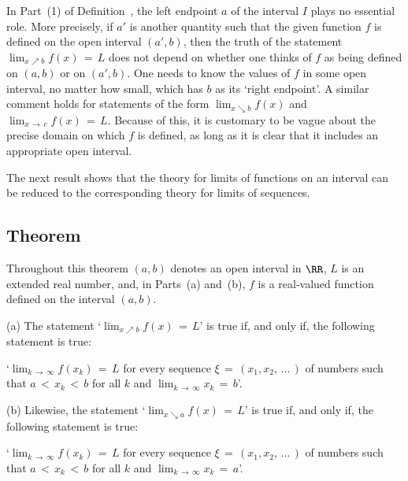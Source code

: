 {        In Part~(1) of Definition~, the left endpoint $a$ of the interval $I$ plays no essential role.
    More precisely, if $a'$ is another quantity such that the given function $f$ is defined on the open interval $(a',b)$,
    then the truth of the statement ${\displaystyle \lim_{x{\nearrow}b} f(x) \,=\, L}$ does not depend on whether one thinks of $f$ as being defined on $(a,b)$ or on $(a',b)$.
    One needs to know the values of $f$ in some open interval, no matter how small, which has $b$ as its `right endpoint'.
    A similar comment holds for statements of the form ${\displaystyle \lim_{x{\searrow}b} f(x)}$ and ${\displaystyle \lim_{x \,{\rightarrow}\,c} f(x) \,=\, L}$.
    Because of this, it is customary to be vague about the precise domain on which $f$ is defined, as long as it is clear that it includes an appropriate open interval.

\V
\V

        The next result shows that the theory for limits of functions on an interval can be reduced to the corresponding theory for limits of sequences.

\V

            \subsection{\small{\bf Theorem}}
            \label{ThmC90.40}

        Throughout this theorem $(a,b)$ denotes an open interval in ${\RR}$,  $L$ is an extended real number,
    and, in Parts~(a) and~(b), $f$ is a real-valued function defined on the interval $(a,b)$.

\V

        (a) The statement `${\displaystyle \lim_{x{\nearrow}b} f(x) \,=\, L}$' is true if, and only if, the following statement is true:

        `${\displaystyle \lim_{k \,{\rightarrow}\, {\infty}} f(x_{k}) \,=\, L}$ for every sequence ${\xi} \,=\, (x_{1},x_{2},\,{\ldots}\,)$ of numbers such that $a\,<\,x_{k}\,<\,b$ for all $k$ and ${\displaystyle \lim_{k \,{\rightarrow}\, {\infty}} x_{k} \,=\, b}$'.

\V

        (b) Likewise, the statement `${\displaystyle \lim_{x{\searrow}a} f(x) \,=\, L}$' is true if, and only if, the following statement is true:

        `${\displaystyle \lim_{k \,{\rightarrow}\, {\infty}} f(x_{k}) \,=\, L}$ for every sequence ${\xi} \,=\, (x_{1},x_{2},\,{\ldots}\,)$ of numbers such that $a\,<\,x_{k}\,<\,b$ for all $k$ and ${\displaystyle \lim_{k \,{\rightarrow}\, {\infty}} x_{k} \,=\, a}$'.

}

